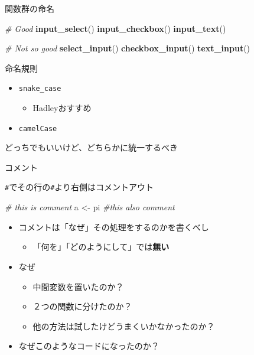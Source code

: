 \documentclass[ignorenonframetext,]{beamer}
\newenvironment{Shaded}{\begin{snugshade}}{\end{snugshade}}
\newcommand{\KeywordTok}[1]{\textcolor[rgb]{0.13,0.29,0.53}{\textbf{#1}}}
\newcommand{\StringTok}[1]{\textcolor[rgb]{0.31,0.60,0.02}{#1}}
\newcommand{\CommentTok}[1]{\textcolor[rgb]{0.56,0.35,0.01}{\textit{#1}}}
\newcommand{\NormalTok}[1]{#1}
\providecommand{\tightlist}{%
  \setlength{\itemsep}{0pt}\setlength{\parskip}{0pt}}
\begin{document}
\begin{frame}[fragile]{関数群の命名}

\begin{Shaded}
\begin{Highlighting}[]
\CommentTok{# Good}
\KeywordTok{input_select}\NormalTok{()}
\KeywordTok{input_checkbox}\NormalTok{()}
\KeywordTok{input_text}\NormalTok{()}

\CommentTok{# Not so good}
\KeywordTok{select_input}\NormalTok{()}
\KeywordTok{checkbox_input}\NormalTok{()}
\KeywordTok{text_input}\NormalTok{() }
\end{Highlighting}
\end{Shaded}

\end{frame}

\begin{frame}[fragile]{命名規則}

\begin{itemize}
\tightlist
\item
  \texttt{snake\_case}

  \begin{itemize}
  \tightlist
  \item
    Hadleyおすすめ
  \end{itemize}
\item
  \texttt{camelCase}
\end{itemize}

どっちでもいいけど、どちらかに統一するべき

\end{frame}

\begin{frame}[fragile]{コメント}

\texttt{\#}でその行の\texttt{\#}より右側はコメントアウト

\begin{Shaded}
\begin{Highlighting}[]
\CommentTok{# this is comment}
\NormalTok{a <-}\StringTok{ }\NormalTok{pi }\CommentTok{#this also comment}
\end{Highlighting}
\end{Shaded}

\begin{itemize}
\tightlist
\item
  コメントは「なぜ」その処理をするのかを書くべし

  \begin{itemize}
  \tightlist
  \item
    「何を」「どのようにして」では\textbf{無い}
  \end{itemize}
\item
  なぜ

  \begin{itemize}
  \tightlist
  \item
    中間変数を置いたのか？
  \item
    ２つの関数に分けたのか？
  \item
    他の方法は試したけどうまくいかなかったのか？
  \end{itemize}
\item
  なぜこのようなコードになったのか？
\end{itemize}

\end{frame}
\end{document}
